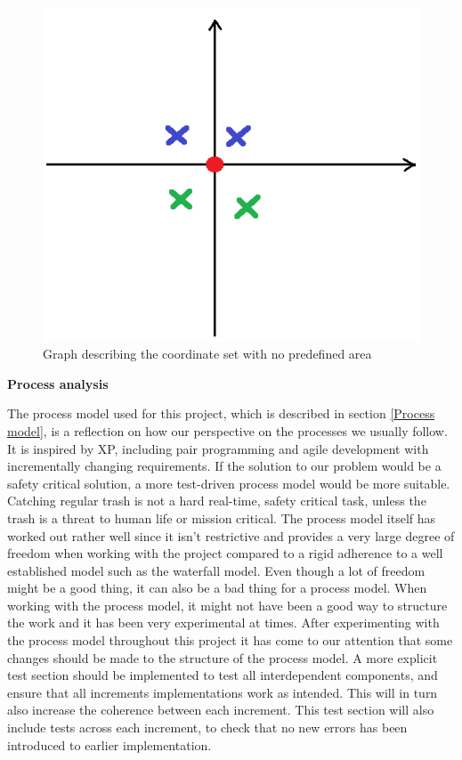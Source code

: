 \begin{figure}[h]
	\centering
	\includegraphics[scale=0.75]{billeder/discussion-graph.png}
	\caption{Graph describing the coordinate set with no predefined area}
	\label{figure:graph}
\end{figure}

\textbf{Process analysis}

The process model used for this project, which is described in section \ref{Process model}, is a reflection on how our perspective on the processes we usually follow. It is inspired by XP, including pair programming and agile development with incrementally changing requirements. If the solution to our problem would be a safety critical solution, a more test-driven process model would be more suitable. Catching regular trash is not a hard real-time, safety critical task, unless the trash is a threat to human life or mission critical.\newline
The process model itself has worked out rather well since it isn’t restrictive and provides a very large degree of freedom when working with the project compared to a rigid adherence to a well established model such as the waterfall model. \newline
Even though a lot of freedom might be a good thing, it can also be a bad thing for a process model. When working with the process model, it might not have been a good way to structure the work and it has been very experimental at times. \newline
After experimenting with the process model throughout this project it has come to our attention that some changes should be made to the structure of the process model. A more explicit test section should be implemented to test all interdependent components, and ensure that all increments implementations work as intended. This will in turn also increase the coherence between each increment. This test section will also include tests across each increment, to check that no new errors has been introduced to earlier implementation.


